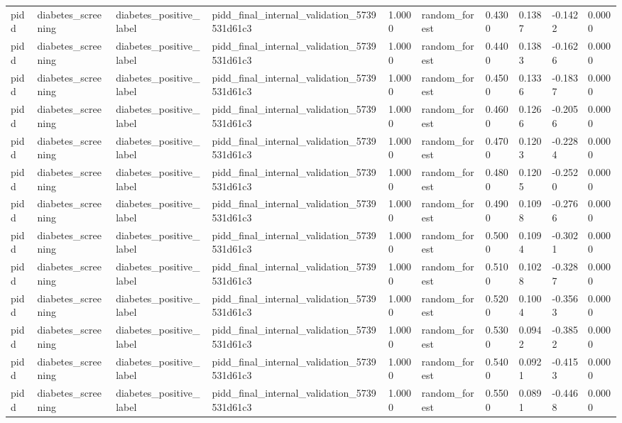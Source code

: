 \begin{tabular}{llllllllll}
pidd & diabetes\_screening & diabetes\_positive\_label & pidd\_final\_internal\_validation\_5739531d61c3 & 1.0000 & random\_forest & 0.4300 & 0.1387 & -0.1422 & 0.0000 \\
pidd & diabetes\_screening & diabetes\_positive\_label & pidd\_final\_internal\_validation\_5739531d61c3 & 1.0000 & random\_forest & 0.4400 & 0.1383 & -0.1626 & 0.0000 \\
pidd & diabetes\_screening & diabetes\_positive\_label & pidd\_final\_internal\_validation\_5739531d61c3 & 1.0000 & random\_forest & 0.4500 & 0.1336 & -0.1837 & 0.0000 \\
pidd & diabetes\_screening & diabetes\_positive\_label & pidd\_final\_internal\_validation\_5739531d61c3 & 1.0000 & random\_forest & 0.4600 & 0.1266 & -0.2056 & 0.0000 \\
pidd & diabetes\_screening & diabetes\_positive\_label & pidd\_final\_internal\_validation\_5739531d61c3 & 1.0000 & random\_forest & 0.4700 & 0.1203 & -0.2284 & 0.0000 \\
pidd & diabetes\_screening & diabetes\_positive\_label & pidd\_final\_internal\_validation\_5739531d61c3 & 1.0000 & random\_forest & 0.4800 & 0.1205 & -0.2520 & 0.0000 \\
pidd & diabetes\_screening & diabetes\_positive\_label & pidd\_final\_internal\_validation\_5739531d61c3 & 1.0000 & random\_forest & 0.4900 & 0.1098 & -0.2766 & 0.0000 \\
pidd & diabetes\_screening & diabetes\_positive\_label & pidd\_final\_internal\_validation\_5739531d61c3 & 1.0000 & random\_forest & 0.5000 & 0.1094 & -0.3021 & 0.0000 \\
pidd & diabetes\_screening & diabetes\_positive\_label & pidd\_final\_internal\_validation\_5739531d61c3 & 1.0000 & random\_forest & 0.5100 & 0.1028 & -0.3287 & 0.0000 \\
pidd & diabetes\_screening & diabetes\_positive\_label & pidd\_final\_internal\_validation\_5739531d61c3 & 1.0000 & random\_forest & 0.5200 & 0.1004 & -0.3563 & 0.0000 \\
pidd & diabetes\_screening & diabetes\_positive\_label & pidd\_final\_internal\_validation\_5739531d61c3 & 1.0000 & random\_forest & 0.5300 & 0.0942 & -0.3852 & 0.0000 \\
pidd & diabetes\_screening & diabetes\_positive\_label & pidd\_final\_internal\_validation\_5739531d61c3 & 1.0000 & random\_forest & 0.5400 & 0.0921 & -0.4153 & 0.0000 \\
pidd & diabetes\_screening & diabetes\_positive\_label & pidd\_final\_internal\_validation\_5739531d61c3 & 1.0000 & random\_forest & 0.5500 & 0.0891 & -0.4468 & 0.0000 \\

\end{tabular}
